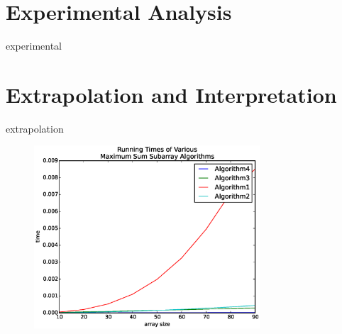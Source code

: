\documentclass[letWterpaper,10pt,titlepage]{article}
\begin{document}
\section{Experimental Analysis}
experimental

\section{Extrapolation and Interpretation}
extrapolation
\begin{figure}
    \centering
    \includegraphics[width=0.75\textwidth]{../bin/testrun.eps}
\end{figure}
\end{document}
